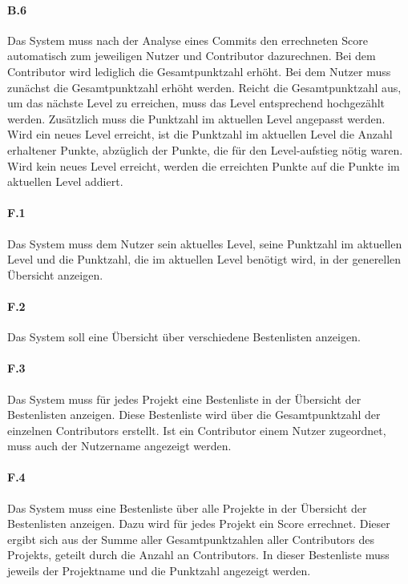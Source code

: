 \documentclass[
	oneside,  %
	ngerman, 
	final, 
	11pt, 
	a4paper, 
	1.1headlines, 
	headinclude=false, 
	footinclude=false, 
	mpinclude=false, 
	pagesize, 
	onecolumn, 
	titlepage, 
	parskip=half, 
	headsepline, 
	chapterprefix=false, 
	version=first, 
	listof=totoc, 
	bibliography=totoc, 
	toc=graduated, 
	fleqn
]{scrbook}
\begin{document}
\paragraph{B.6}
Das System muss nach der Analyse eines Commits den errechneten Score automatisch zum jeweiligen Nutzer und Contributor dazurechnen.
Bei dem Contributor wird lediglich die Gesamtpunktzahl erhöht.
Bei dem Nutzer muss zunächst die Gesamtpunktzahl erhöht werden.
Reicht die Gesamtpunktzahl aus, um das nächste Level zu erreichen, muss das Level entsprechend hochgezählt werden.
Zusätzlich muss die Punktzahl im aktuellen Level angepasst werden.
Wird ein neues Level erreicht, ist die Punktzahl im aktuellen Level die Anzahl erhaltener Punkte, abzüglich der Punkte, die für den Level-aufstieg nötig waren.
Wird kein neues Level erreicht, werden die erreichten Punkte auf die Punkte im aktuellen Level addiert.

\paragraph{F.1}
Das System muss dem Nutzer sein aktuelles Level, seine Punktzahl im aktuellen Level und die Punktzahl, die im aktuellen Level benötigt wird, in der generellen Übersicht anzeigen.

\paragraph{F.2}
Das System soll eine Übersicht über verschiedene Bestenlisten anzeigen.

\paragraph{F.3}
Das System muss für jedes Projekt eine Bestenliste in der Übersicht der Bestenlisten anzeigen.
Diese Bestenliste wird über die Gesamtpunktzahl der einzelnen Contributors erstellt.
Ist ein Contributor einem Nutzer zugeordnet, muss auch der Nutzername angezeigt werden.

\paragraph{F.4}
Das System muss eine Bestenliste über alle Projekte in der Übersicht der Bestenlisten anzeigen.
Dazu wird für jedes Projekt ein Score errechnet.
Dieser ergibt sich aus der Summe aller Gesamtpunktzahlen aller Contributors des Projekts, geteilt durch die Anzahl an Contributors.
In dieser Bestenliste muss jeweils der Projektname und die Punktzahl angezeigt werden.
\end{document}
